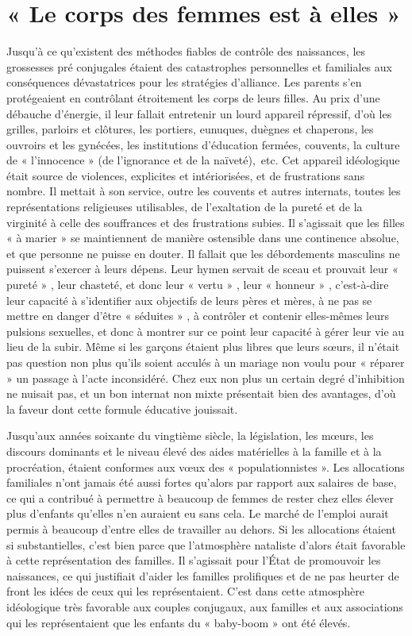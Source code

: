 
\chapter{« Le corps des femmes est à elles »}


 Jusqu'à ce qu'existent des méthodes fiables de contrôle des naissances, les grossesses pré conjugales étaient des catastrophes personnelles et familiales aux conséquences dévastatrices pour les stratégies d'alliance. Les parents s'en protégeaient en contrôlant étroitement les corps de leurs filles. Au prix d'une débauche d'énergie, il leur fallait entretenir un lourd appareil répressif, d'où les grilles, parloirs et clôtures, les portiers, eunuques, duègnes et chaperons, les ouvroirs et les gynécées, les institutions d'éducation fermées, couvents, la culture de « l'innocence » (de l'ignorance et de la naïveté),~etc. Cet appareil idéologique était source de violences, explicites et intériorisées, et de frustrations sans nombre. Il mettait à son service, outre les couvents et autres internats, toutes les représentations religieuses utilisables, de l'exaltation de la pureté et de la virginité à celle des souffrances et des frustrations subies. Il s'agissait que les filles « à marier » se maintiennent de manière ostensible dans une continence absolue, et que personne ne puisse en douter. Il fallait que les débordements masculins ne puissent s'exercer à leurs dépens. Leur hymen servait de sceau et prouvait leur « pureté » , leur chasteté, et donc leur « vertu » , leur « honneur » , c'est-à-dire leur capacité à s'identifier aux objectifs de leurs pères et mères, à ne pas se mettre en danger d'être « séduites » , à contrôler et contenir elles-mêmes leurs pulsions sexuelles, et donc à montrer sur ce point leur capacité à gérer leur vie au lieu de la subir. Même si les garçons étaient plus libres que leurs sœurs, il n'était pas question non plus qu'ils soient acculés à un mariage non voulu pour « réparer » un passage à l'acte inconsidéré. Chez eux non plus un certain degré d'inhibition ne nuisait pas, et un bon internat non mixte présentait bien des avantages, d'où la faveur dont cette formule éducative jouissait.

 Jusqu'aux années soixante du vingtième siècle, la législation, les mœurs, les discours dominants et le niveau élevé des aides matérielles à la famille et à la procréation, étaient conformes aux vœux des « populationnistes ». Les allocations familiales n'ont jamais été aussi fortes qu'alors par rapport aux salaires de base, ce qui a contribué à permettre à beaucoup de femmes de rester chez elles élever plus d'enfants qu'elles n'en auraient eu sans cela. Le marché de l'emploi aurait permis à beaucoup d'entre elles de travailler au dehors. Si les allocations étaient si substantielles, c'est bien parce que l'atmosphère nataliste d'alors était favorable à cette représentation des familles. Il s'agissait pour l'État de promouvoir les naissances, ce qui justifiait d'aider les familles prolifiques et de ne pas heurter de front les idées de ceux qui les représentaient. C'est dans cette atmosphère idéologique très favorable aux couples conjugaux, aux familles et aux associations qui les représentaient que les enfants du « baby-boom » ont été élevés. 

